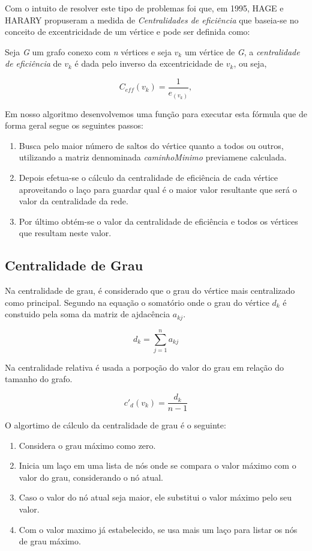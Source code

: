 \documentclass[12pt]{article}
\begin{document}
Com o intuito de resolver este tipo de problemas foi que, em 1995,  HAGE e HARARY propuseram a medida de {\it Centralidades de eficiência} que baseia-se no conceito de excentricidade de um vértice e pode ser definida como: 

Seja  {\it G} um grafo conexo com {\it n} vértices  e seja $v_k$ um vértice de {\it G}, a {\it centralidade de eficiência} de $v_k$ é dada pelo inverso da excentricidade de $v_k$, ou seja,
\begin{center}
\begin{equation}
C_{eff}(v_k)= \frac{1}{e_{(v_k)}},
\end{equation}
\end{center}
Em nosso algoritmo desenvolvemos uma função para executar esta fórmula que de forma geral segue os seguintes passos:
\begin{enumerate}
\item Busca pelo maior número de saltos do vértice quanto a todos ou outros, utilizando a matriz dennominada {\it caminhoMinimo} previamene calculada.
\item Depois efetua-se o cálculo da centralidade de eficiência de cada vértice aproveitando o laço para guardar qual é o maior valor resultante que será o valor da centralidade da rede.
\item Por último obtém-se o valor da centralidade de eficiência e todos os vértices que resultam neste valor. 
\end{enumerate} 
   
\subsection{Centralidade de Grau}
Na centralidade de grau, é considerado que o grau do vértice mais centralizado como principal.
Segundo \cite{freitas} na equação o somatório onde o grau do vértice $d_{k}$ é constuido pela soma da matriz de ajdacência $a_{kj}$.
\begin{center}
\begin{equation}
d_{k}= \sum_{j=1}^{n}a_{kj}
\end{equation}
\end{center}
Na centralidade relativa é usada a porpoção do valor do grau em relação do tamanho do grafo.
\begin{center}
\begin{equation}
{c}'_{d}(v_{k})=\frac{d_k}{n-1}
\end{equation}
\end{center}
O algortimo de cálculo da centralidade de grau é o seguinte:
\begin{enumerate}
\item Considera o grau máximo como zero.
\item Inicia um laço em uma lista de nós onde se compara o valor máximo com o valor do grau, considerando o nó atual.
\item Caso o valor do nó atual seja maior, ele substitui o valor máximo pelo seu valor.
\item Com o valor maximo já estabelecido, se usa mais um laço para listar os nós de grau máximo.
\end{enumerate}
\end{document}
